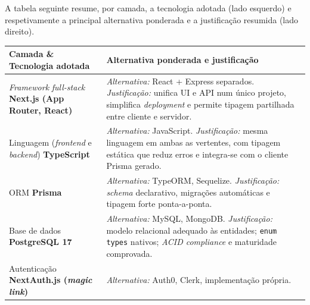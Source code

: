 \documentclass[11pt,a4paper]{article}
\begin{document}
A tabela seguinte resume, por camada, a tecnologia adotada (lado esquerdo) e
respetivamente a principal alternativa ponderada e a justificação resumida
(lado direito).

\begin{table}[H]
    \centering
    \footnotesize
    \renewcommand{\arraystretch}{1.35}
    \begin{tabularx}{\linewidth}{@{}>{\raggedright\arraybackslash}p{4.6cm}X@{}}
        \toprule
        \textbf{Camada \& Tecnologia adotada}                                                            & \textbf{Alternativa ponderada e justificação}                                                                                                          \\
        \midrule
        \emph{Framework} \emph{full-stack} \newline \textbf{Next.js (App Router, React)}                 & \textit{Alternativa:} React + Express separados. \newline
        \textit{Justificação:} unifica UI e API num único projeto, simplifica \emph{deployment} e permite tipagem partilhada entre cliente e servidor.   \\
        \midrule
        Linguagem (\emph{frontend} e \emph{backend}) \newline \textbf{TypeScript}                        & \textit{Alternativa:} JavaScript. \newline
        \textit{Justificação:} mesma linguagem em ambas as vertentes, com tipagem estática que reduz erros e integra-se com o cliente Prisma gerado.    \\
        \midrule
        ORM \newline \textbf{Prisma}                                                                     & \textit{Alternativa:} TypeORM, Sequelize. \newline
        \textit{Justificação:} \emph{schema} declarativo, migrações automáticas e tipagem forte ponta-a-ponta.                                          \\
        \midrule
        Base de dados \newline \textbf{PostgreSQL 17}                                                    & \textit{Alternativa:} MySQL, MongoDB. \newline
        \textit{Justificação:} modelo relacional adequado às entidades; \texttt{enum types} nativos; \emph{ACID compliance} e maturidade comprovada.    \\
        \midrule
        Autenticação \newline \textbf{NextAuth.js (\emph{magic link})}                                   & \textit{Alternativa:} Auth0, Clerk, implementação própria. \newline

\end{tabularx}
\end{table}
\end{document}
